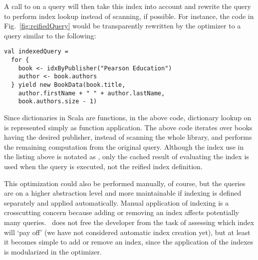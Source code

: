 
A call to  on a query will then take this index into account and rewrite the query to perform index lookup instead of scanning, if possible. For instance, the code in Fig.~\ref{fig:reifiedQuery} would be transparently rewritten by the optimizer to a query similar to the following:
\begin{lstlisting}
val indexedQuery =
  for {
    book <- idxByPublisher("Pearson Education")
    author <- book.authors
  } yield new BookData(book.title,
    author.firstName + " " + author.lastName,
    book.authors.size - 1)
\end{lstlisting}
Since dictionaries in Scala are functions, in the above code, dictionary lookup on  is represented simply as function application. The above code iterates over books having the desired publisher, instead of scanning the whole library, and performs the remaining computation from the original query. Although the index use in the listing above is notated as
, only the cached result of evaluating the index is used when
the query is executed, not the reified index definition.

This optimization could also be performed manually, of course, but the queries are on a higher abstraction level and more maintainable if indexing is defined separately and applied automatically.
Manual application of indexing is a crosscutting concern because adding or removing an index affects potentially many queries.
\LoS\ does not free the developer from the task of assessing which index will `pay off' (we have not considered
automatic index creation yet), but at least it becomes simple to add or remove an index, since the application
of the indexes is modularized in the optimizer.


